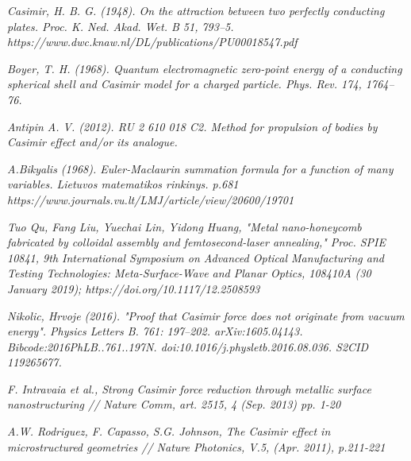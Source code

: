 \documentclass[11pt]{article}
\begin{document}
    \begin{thebibliography}{99}

\textit{Casimir, H. B. G. (1948). On the attraction between two perfectly conducting plates. Proc. K. Ned. Akad. Wet. B 51, 793–5.
https://www.dwc.knaw.nl/DL/publications/PU00018547.pdf}

\textit{Boyer, T. H. (1968). Quantum electromagnetic zero-point energy of a conducting spherical shell and Casimir model for a charged particle. Phys. Rev. 174, 1764–76.}

\textit{Antipin A. V. (2012). RU 2 610 018 C2. Method for propulsion of bodies by Casimir effect and/or its analogue.}

\textit{A.Bikyalis (1968). Euler-Maclaurin summation formula for a function of many variables.  Lietuvos matematikos rinkinys. p.681
https://www.journals.vu.lt/LMJ/article/view/20600/19701}

\textit{Tuo Qu, Fang Liu, Yuechai Lin, Yidong Huang, "Metal nano-honeycomb fabricated by colloidal assembly and femtosecond-laser annealing," Proc. SPIE 10841, 9th International Symposium on Advanced Optical Manufacturing and Testing Technologies: Meta-Surface-Wave and Planar Optics, 108410A (30 January 2019); https://doi.org/10.1117/12.2508593}

\textit{Nikolic, Hrvoje (2016). "Proof that Casimir force does not originate from vacuum energy". Physics Letters B. 761: 197–202. arXiv:1605.04143. Bibcode:2016PhLB..761..197N. doi:10.1016/j.physletb.2016.08.036. S2CID 119265677.}

\textit{F. Intravaia et al., Strong Casimir force reduction through metallic surface nanostructuring // Nature Comm, art. 2515, 4 (Sep. 2013) pp. 1-20}

\textit{A.W. Rodriguez, F. Capasso, S.G. Johnson, The Casimir effect in microstructured geometries // Nature Photonics, V.5, (Apr. 2011), p.211-221}

\end{thebibliography}


    
    
    
\end{document}
